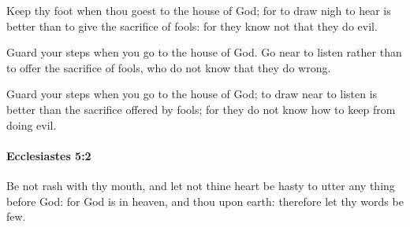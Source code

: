 			\begin{versebox}
					\item[BHS] 
					\item[LXX] 
					\item[ASV] Keep thy foot when thou goest to the house of God; for to draw nigh to hear is better than to give the sacrifice of fools: for they know not that they do evil.
					\item[NIV] Guard your steps when you go to the house of God. Go near to listen rather than to offer the sacrifice of fools, who do not know that they do wrong.
					\item[NRSV] Guard your steps when you go to the house of God; to draw near to listen is better than the sacrifice offered by fools; for they do not know how to keep from doing evil.
			\end{versebox}

		\paragraph{Ecclesiastes 5:2} %
			\label{ECCLESIASTES-5-2}

			Be not rash with thy mouth, and let not thine heart be hasty to utter any thing before God: for God is in heaven, and thou upon earth: therefore let thy words be few.

